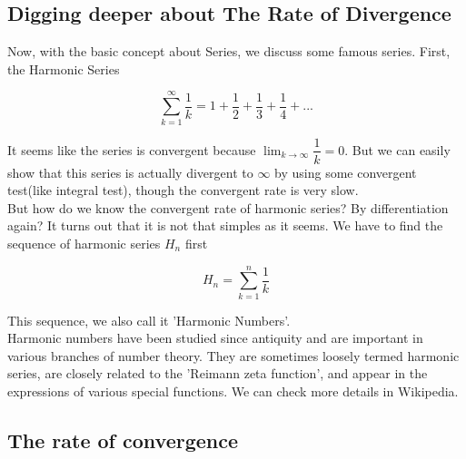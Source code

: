 \documentclass{article}
\begin{document}
  \subsection{Digging deeper about The Rate of Divergence}
  Now, with the basic concept about Series, we discuss some famous series. First, the Harmonic Series

  \[
	  \sum_{k=1}^{\infty} \dfrac{1}{k} = 1 + \dfrac{1}{2} + \dfrac{1}{3} + \dfrac{1}{4} + ...
  \]

  It seems like the series is convergent because $\displaystyle \lim_{k \to \infty} \dfrac{1}{k} = 0$. But we can easily show that this series is actually divergent to $\infty$ by using some convergent test(like integral test), though the convergent rate is very slow. \\

  But how do we know the convergent rate of harmonic series? By differentiation again? It turns out that it is not that simples as it seems. We have to find the sequence of harmonic series $H_n$ first

  \[
	  H_n = \sum_{k=1}^{n} \dfrac{1}{k}
  \]

  This sequence, we also call it 'Harmonic Numbers'. \\

  Harmonic numbers have been studied since antiquity and are important in various branches of number theory. They are sometimes loosely termed harmonic series, are closely related to the 'Reimann zeta function', and appear in the expressions of various special functions. We can check more details in Wikipedia.


  \subsection{The rate of convergence}
\end{document}
